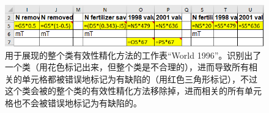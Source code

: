 \begin{figure}[tbp]
    \centering
    \includegraphics[width=\columnwidth]{figure/figure4.png}
    \caption{用于展现\wa 的整个类有效性精化方法的工作表``World 1996''。\cu 识别出了一个类（用花色标记出来，但整个类是不合理的），进而导致所有相关的单元格都被错误地标记为有缺陷的（用红色三角形标记），不过这个类会被\wa 的整个类的有效性精化方法移除掉，进而相关的所有单元格也不会被错误地标记为有缺陷的。}
    \label{figure4}
\end{figure}